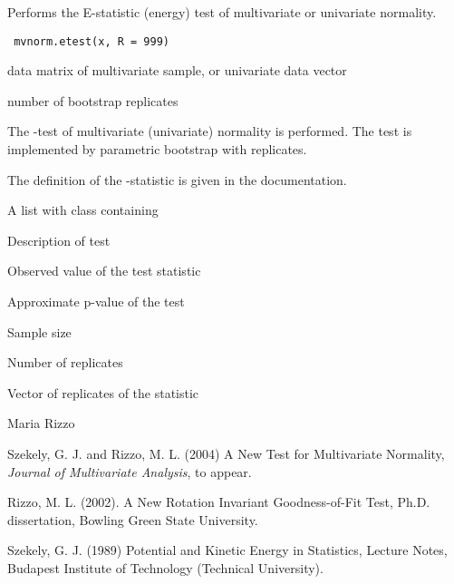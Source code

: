 \begin{Description}\relax
Performs the E-statistic (energy) test of multivariate or univariate normality.
\end{Description}
\begin{Usage}
\begin{verbatim}
 mvnorm.etest(x, R = 999)
\end{verbatim}
\end{Usage}
\begin{Arguments}
\begin{ldescription}
\item[\code{x}] data matrix of multivariate sample, or univariate data vector
\item[\code{R}] number of bootstrap replicates 
\end{ldescription}
\end{Arguments}
\begin{Details}\relax
The -test of multivariate (univariate) normality
is performed. The test is implemented by parametric bootstrap with 
 replicates. 

The definition of the -statistic is given in the 
 documentation.\end{Details}
\begin{Value}
A list with class  containing
\begin{ldescription}
\item[\code{method}] Description of test
\item[\code{statistic}] Observed value of the test statistic
\item[\code{p.value}] Approximate p-value of the test
\item[\code{n}] Sample size
\item[\code{R}] Number of replicates
\item[\code{replicates}] Vector of replicates of the statistic
\end{ldescription}
\end{Value}
\begin{Author}\relax
Maria Rizzo 
\end{Author}
\begin{References}\relax
Szekely, G. J. and Rizzo, M. L. (2004) A New Test for 
Multivariate Normality, \emph{Journal of Multivariate Analysis},
to appear.

Rizzo, M. L. (2002). A New Rotation Invariant Goodness-of-Fit Test,
Ph.D. dissertation, Bowling Green State University.

Szekely, G. J. (1989) Potential and Kinetic Energy in Statistics, 
Lecture Notes, Budapest Institute of Technology (Technical University).\end{References}

